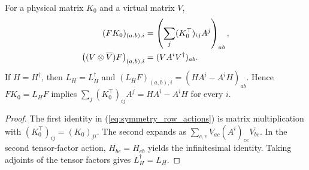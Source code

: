 \begin{lemma}
    \label{thm:row_physical_virtual_actions}
    \leanok
    For a physical matrix $K_0$ and a virtual matrix $V$,
    \begin{align}
        (FK_0)_{(a,b),i}
         & =\left(\sum_j(K_0^{\top})_{ij}A^j\right)_{ab},\notag \\
        \bigl((V\otimes\overline V)F\bigr)_{(a,b),i}
         & =(VA^iV^\dagger)_{ab}.
        \label{eq:symmetry_row_actions}
    \end{align}
    If $H=H^\dagger$, then $L_H=L_H^\dagger$ and
    $(L_HF)_{(a,b),i}=(HA^i-A^iH)_{ab}$.
    Hence $FK_0=L_HF$ implies
    $\sum_j(K_0^{\top})_{ij}A^j=HA^i-A^iH$ for every $i$.
\end{lemma}
\begin{proof}\leanok
    The first identity in (\ref{eq:symmetry_row_actions}) is matrix
    multiplication with $(K_0^\top)_{ij}=(K_0)_{ji}$.
    The second expands as
    $\sum_{c,e}V_{ac}(A^i)_{ce}\overline{V_{be}}$.
    In the second tensor-factor action,
    $\overline{H_{be}}=H_{eb}$ yields the infinitesimal identity.
    Taking adjoints of the tensor factors gives $L_H^\dagger=L_H$.
\end{proof}

